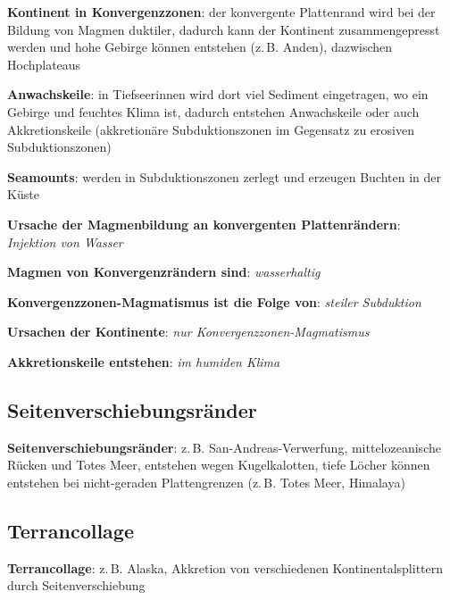 \textbf{Kontinent in Konvergenzzonen}:
der konvergente Plattenrand wird bei der Bildung von Magmen duktiler,
dadurch kann der Kontinent zusammengepresst werden und hohe Gebirge können entstehen
(z.\,B. Anden), dazwischen Hochplateaus

\textbf{Anwachskeile}:
in Tiefseerinnen wird dort viel Sediment eingetragen, wo ein Gebirge und feuchtes Klima ist,
dadurch entstehen Anwachskeile oder auch Akkretionskeile
(akkretionäre Subduktionszonen im Gegensatz zu erosiven Subduktionszonen)

\textbf{Seamounts}:
werden in Subduktionszonen zerlegt und erzeugen Buchten in der Küste

\begin{wichtig}
    \item
    \textbf{Ursache der Magmenbildung an konvergenten Plattenrändern}:\\
    \emph{Injektion von Wasser}
    
    \item
    \textbf{Magmen von Konvergenzrändern sind}:
    \emph{wasserhaltig}
    
    \item
    \textbf{Konvergenzzonen-Magmatismus ist die Folge von}:
    \emph{steiler Subduktion}
    
    \item
    \textbf{Ursachen der Kontinente}:
    \emph{nur Konvergenzzonen-Magmatismus}
    
    \item
    \textbf{Akkretionskeile entstehen}:
    \emph{im humiden Klima}
\end{wichtig}

\subsection{%
    Seitenverschiebungsränder%
}

\textbf{Seitenverschiebungsränder}:
z.\,B. San-Andreas-Verwerfung, mittelozeanische Rücken und Totes Meer,
entstehen wegen Kugelkalotten,
tiefe Löcher können entstehen bei nicht-geraden Plattengrenzen
(z.\,B. Totes Meer, Himalaya)

\subsection{%
    Terrancollage%
}

\textbf{Terrancollage}:
z.\,B. Alaska,
Akkretion von verschiedenen Kontinentalsplittern durch Seitenverschiebung

